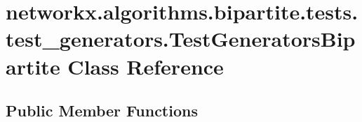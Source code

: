 \hypertarget{classnetworkx_1_1algorithms_1_1bipartite_1_1tests_1_1test__generators_1_1TestGeneratorsBipartite}{}\section{networkx.\+algorithms.\+bipartite.\+tests.\+test\+\_\+generators.\+Test\+Generators\+Bipartite Class Reference}
\label{classnetworkx_1_1algorithms_1_1bipartite_1_1tests_1_1test__generators_1_1TestGeneratorsBipartite}
\subsection*{Public Member Functions}
